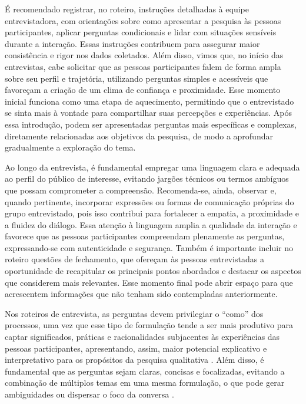 \documentclass[12pt, a4paper, openany]{book}
\begin{document}
\'E recomendado registrar, no roteiro, instru\c{c}\~oes detalhadas \`a equipe entrevistadora, com orienta\c{c}\~oes sobre como apresentar a pesquisa \`as pessoas participantes, aplicar perguntas condicionais e lidar com situa\c{c}\~oes sens\'iveis durante a intera\c{c}\~ao. Essas instru\c{c}\~oes contribuem para assegurar maior consist\^encia e rigor nos dados coletados. Al\'em disso, vimos que, no in\'icio das entrevistas, cabe solicitar que as pessoas participantes falem de forma ampla sobre seu perfil e trajet\'oria, utilizando perguntas simples e acess\'iveis que favore\c{c}am a cria\c{c}\~ao de um clima de confian\c{c}a e proximidade. Esse momento inicial funciona como uma etapa de aquecimento, permitindo que o entrevistado se sinta mais \`a vontade para compartilhar suas percep\c{c}\~oes e experi\^encias. Ap\'os essa introdu\c{c}\~ao, podem ser apresentadas perguntas mais espec\'ificas e complexas, diretamente relacionadas aos objetivos da pesquisa, de modo a aprofundar gradualmente a explora\c{c}\~ao do tema.

Ao longo da entrevista, \'e fundamental empregar uma linguagem clara e adequada ao perfil do p\'ublico de interesse, evitando jarg\~oes t\'ecnicos ou termos amb\'iguos que possam comprometer a compreens\~ao. Recomenda-se, ainda, observar e, quando pertinente, incorporar express\~oes ou formas de comunica\c{c}\~ao pr\'oprias do grupo entrevistado, pois isso contribui para fortalecer a empatia, a proximidade e a fluidez do di\'alogo. Essa aten\c{c}\~ao \`a linguagem amplia a qualidade da intera\c{c}\~ao e favorece que as pessoas participantes compreendam plenamente as perguntas, expressando-se com autenticidade e seguran\c{c}a. Tamb\'em \'e importante incluir no roteiro quest\~oes de fechamento, que ofere\c{c}am \`as pessoas entrevistadas a oportunidade de recapitular os principais pontos abordados e destacar os aspectos que considerem mais relevantes. Esse momento final pode abrir espa\c{c}o para que acrescentem informa\c{c}\~oes que n\~ao tenham sido contempladas anteriormente.

Nos roteiros de entrevista, as perguntas devem privilegiar o ``como'' dos processos, uma vez que esse tipo de formula\c{c}\~ao tende a ser mais produtivo para captar significados, pr\'aticas e racionalidades subjacentes \`as experi\^encias das pessoas participantes, apresentando, assim, maior potencial explicativo e interpretativo para os prop\'ositos da pesquisa qualitativa \citep{albaret2023semistructured}. Al\'em disso, \'e fundamental que as perguntas sejam claras, concisas e focalizadas, evitando a combina\c{c}\~ao de m\'ultiplos temas em uma mesma formula\c{c}\~ao, o que pode gerar ambiguidades ou dispersar o foco da conversa \citep{driscoll2011introduction}.
\end{document}
